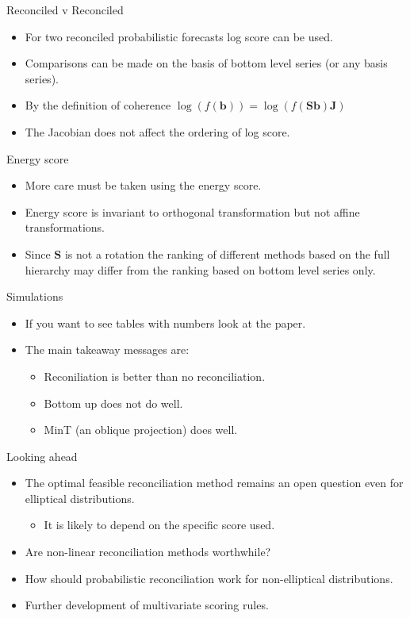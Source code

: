 \documentclass{beamer}
\begin{document}
  \begin{frame}{Reconciled v Reconciled}
	\begin{itemize}
		\item For two reconciled probabilistic forecasts log score can be used.
		\item Comparisons can be made on the basis of bottom level series (or any basis series).
		\item By the definition of coherence $\log (f({\bm b}))=\log (f({\bm S}{\bm b}){\bm J})$
		\item The Jacobian does not affect the ordering of log score.
	\end{itemize}
  \end{frame}
  \begin{frame}{Energy  score}
  	\begin{itemize}
  		\item More care must be taken using the energy score.
  		\item Energy score is invariant to orthogonal transformation but not affine transformations.
  		\item Since ${\bm S}$ is not a rotation the ranking of different methods based on the full hierarchy may differ from the ranking based on bottom level series only.
  	\end{itemize}
  \end{frame}
   \begin{frame}{Simulations}
   	\begin{itemize}
   		\item If you want to see tables with numbers look at the paper.
   		\item The main takeaway messages are:
   		    \begin{itemize}
   		    	\item Reconiliation is better than no reconciliation.
   		    	\item Bottom up does not do well.
   		    	\item MinT (an oblique projection) does well.
   		    \end{itemize} 
   	\end{itemize}
   \end{frame}
   \begin{frame}{Looking ahead}
     \begin{itemize}
     	\item The optimal feasible reconciliation method remains an open question even for elliptical distributions.
     	\begin{itemize}
     		\item It is likely to depend on the specific score used.
     	\end{itemize}
        \item Are non-linear reconciliation methods worthwhile?
        \item How should probabilistic reconciliation work for non-elliptical distributions.
        \item Further development of multivariate scoring rules.
     \end{itemize}	
   \end{frame}
\end{document}
